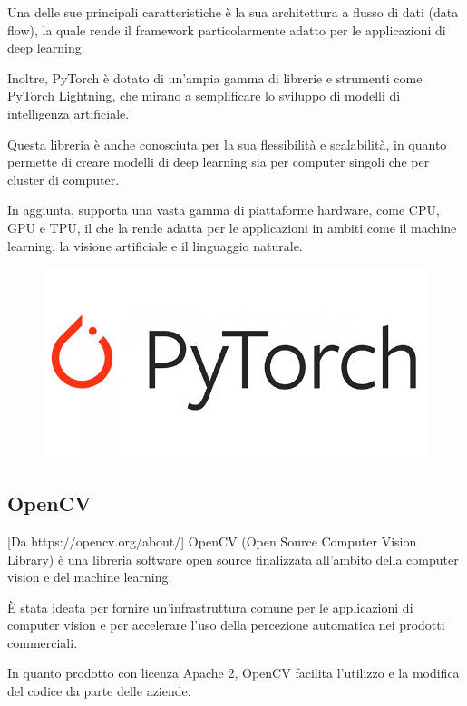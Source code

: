 Una delle sue principali caratteristiche è la sua architettura a flusso di dati (data flow), la quale rende il framework particolarmente adatto per le applicazioni di deep learning. 

Inoltre, PyTorch è dotato di un'ampia gamma di librerie e strumenti come PyTorch Lightning, che mirano a semplificare lo sviluppo di modelli di intelligenza artificiale.

Questa libreria è anche conosciuta per la sua flessibilità e scalabilità, in quanto permette di creare modelli di deep learning sia per computer singoli che per cluster di computer. 

In aggiunta, supporta una vasta gamma di piattaforme hardware, come CPU, GPU e TPU, il che la rende adatta per le applicazioni in ambiti come il machine learning, la visione artificiale e il linguaggio naturale.

\begin{figure}
    \begin{center}    
        \includegraphics[width=0.9\linewidth]{images/image7.png}
    \end{center}
\end{figure}

\subsection{OpenCV}
[Da https://opencv.org/about/]
OpenCV (Open Source Computer Vision Library) è una libreria software open source finalizzata all’ambito della computer vision e del machine learning. 

È stata ideata per fornire un'infrastruttura comune per le applicazioni di computer vision e per accelerare l'uso della percezione automatica nei prodotti commerciali. 

In quanto prodotto con licenza Apache 2, OpenCV facilita l'utilizzo e la modifica del codice da parte delle aziende.


